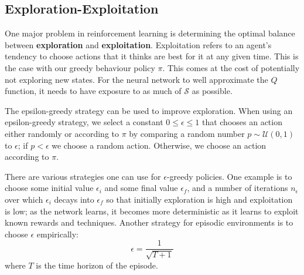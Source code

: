 \documentclass[journal, onecolumn, 12pt, draftclsnofoot]{IEEEtran}
\newcommand{\kword}[1]{\textbf{#1}}
\newcommand{\mc}[1]{\mathcal{#1}}
\begin{document}
		\subsection{Exploration-Exploitation}
		\par One major problem in reinforcement learning is determining the optimal balance between \kword{exploration} and \kword{exploitation}. Exploitation refers to an agent's tendency to choose actions that it thinks are best for it at any given time. This is the case with our greedy behaviour policy $\pi$. This comes at the cost of potentially not exploring new states. For the neural network to well approximate the $Q$ function, it needs to have exposure to as much of $\mc{S}$ as possible.
		\par The epsilon-greedy strategy can be used to improve exploration. When using an epsilon-greedy strategy, we select a constant $0 \leq \epsilon \leq 1$ that chooses an action either randomly or according to $\pi$ by comparing a random number $p \sim \mc{U}(0,1)$ to $\epsilon$; if $p < \epsilon$ we choose a random action. Otherwise, we choose an action according to $\pi$.
		\par There are various strategies one can use for $\epsilon$-greedy policies. One example is to choose some initial value $\epsilon_i$ and some final value $\epsilon_f$, and a number of iterations $n_\epsilon$ over which $\epsilon_i$ decays into $\epsilon_f$ so that initially exploration is high and exploitation is low; as the network learns, it becomes more deterministic as it learns to exploit known rewards and techniques. Another strategy for episodic environments is to choose $\epsilon$ empirically:
		$$\epsilon = \frac{1}{\sqrt{T+1}}$$
		where $T$ is the time horizon of the episode.
\end{document}
